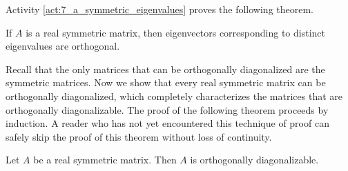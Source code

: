 Activity \ref{act:7_a_symmetric_eigenvalues} proves the following theorem. 


\begin{theorem} If $A$ is a real symmetric matrix, then eigenvectors corresponding to distinct eigenvalues are orthogonal.
\end{theorem}


Recall that the only matrices that can be orthogonally diagonalized are the symmetric matrices. Now we show that every real symmetric matrix can be orthogonally diagonalized, which completely characterizes the matrices that are orthogonally diagonalizable. The proof of the following theorem proceeds by induction. A reader who has not yet encountered this technique of proof can safely skip the proof of this theorem without loss of continuity.  


\begin{theorem} Let $A$ be a real symmetric matrix. Then $A$ is orthogonally diagonalizable.
\end{theorem}


